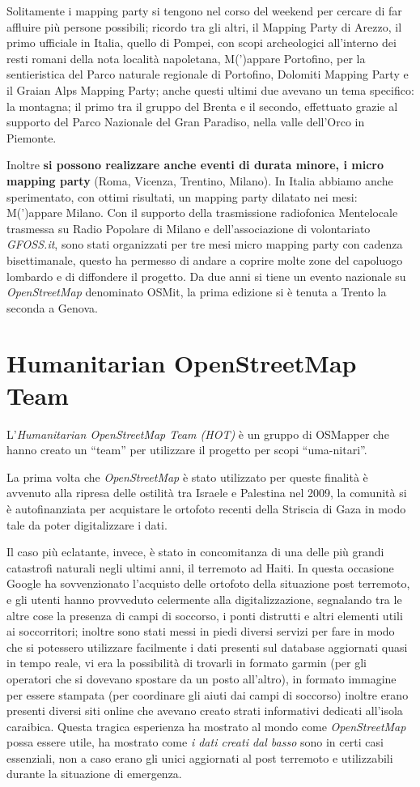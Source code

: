 \documentclass[a4paper,twoside,12pt,]{article}
\newcommand{\osm}{\emph{OpenStreetMap}\xspace}
\newcommand{\pro}[1]{\emph{#1}}
\begin{document}
Solitamente i mapping party si tengono nel corso del weekend per cercare di far affluire più persone possibili; ricordo tra gli altri, il Mapping Party di Arezzo, il primo ufficiale in Italia, quello di Pompei, con scopi archeologici all'interno dei resti romani della nota località napoletana, M(')appare Portofino, per la sentieristica del Parco naturale regionale di Portofino, Dolomiti Mapping Party e il Graian Alps Mapping Party; anche questi ultimi due avevano un tema specifico: la montagna; il primo tra il gruppo del Brenta e il secondo, effettuato grazie al supporto del Parco Nazionale del Gran Paradiso, nella valle dell'Orco in Piemonte.

Inoltre \textbf{si possono realizzare anche eventi di durata minore, i micro mapping party} (Roma, Vicenza, Trentino, Milano). In Italia abbiamo anche sperimentato, con ottimi risultati, un mapping party dilatato nei mesi: M(')appare Milano. Con il supporto della trasmissione radiofonica Mentelocale trasmessa su Radio Popolare di Milano e dell'associazione di volontariato \pro{GFOSS.it}, sono stati organizzati per tre mesi micro mapping party con cadenza bisettimanale, questo ha permesso di andare a coprire molte zone del capoluogo lombardo e di diffondere il progetto. Da due anni si tiene un evento nazionale su \osm denominato OSMit, la prima edizione si è tenuta a Trento la seconda a Genova.
\section{Humanitarian OpenStreetMap Team}
L'\pro{Humanitarian OpenStreetMap Team (HOT)} è un gruppo di OSMapper che hanno creato un ``team'' per utilizzare il progetto per scopi ``uma-nitari''.

La prima volta che \osm è stato utilizzato per queste finalità è avvenuto alla ripresa delle ostilità tra Israele e Palestina nel 2009, la comunità si è autofinanziata per acquistare le ortofoto recenti della Striscia di Gaza in modo tale da poter digitalizzare i dati.

Il caso più eclatante, invece, è stato in concomitanza di una delle più grandi catastrofi naturali negli ultimi anni, il terremoto ad Haiti. In questa occasione Google ha sovvenzionato l'acquisto delle ortofoto della situazione post terremoto, e gli utenti hanno provveduto celermente alla digitalizzazione, segnalando tra le altre cose la presenza di campi di soccorso, i ponti distrutti e altri elementi utili ai soccorritori; inoltre sono stati messi in piedi diversi servizi per fare in modo che si potessero utilizzare facilmente i dati presenti sul database aggiornati quasi in tempo reale, vi era la possibilità di trovarli in formato garmin (per gli operatori che si dovevano spostare da un posto all'altro), in formato immagine per essere stampata (per coordinare gli aiuti dai campi di soccorso) inoltre erano presenti diversi siti online che avevano creato strati informativi dedicati all'isola caraibica. Questa tragica esperienza ha mostrato al mondo come \osm possa essere utile, ha mostrato come \textit{i dati creati dal basso} sono in certi casi essenziali, non a caso erano gli unici aggiornati al post terremoto e utilizzabili durante la situazione di emergenza.
\end{document}

